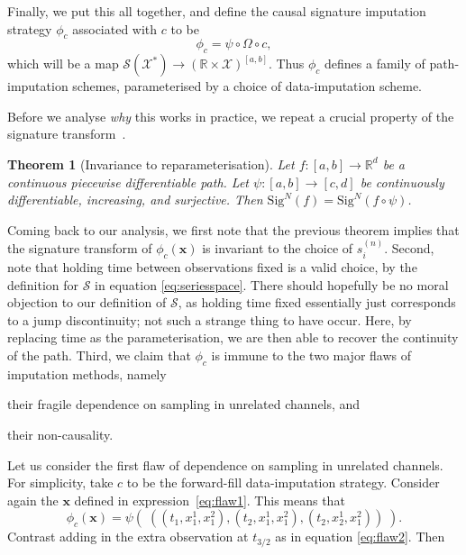\documentclass{article}
\newcommand{\reals}{\mathbb{R}}
\newcommand{\sig}{\mathrm{Sig}^N}
\newcommand{\dataspace}{\mathcal{X}}
\newcommand{\seriesspace}{\mathcal{S}}
\newtheorem{theorem}{Theorem}
\begin{document}
Finally, we put this all together, and define the causal signature imputation strategy $\phi_c$ associated with $c$ to be
%
\begin{equation*}
\phi_c = \psi \circ \Omega \circ c,
\end{equation*}
which will be a map $\seriesspace(\dataspace^*) \to (\reals \times \dataspace)^{[a, b]}$.
%
Thus $\phi_c$ defines a family of path-imputation schemes, parameterised by a choice of data-imputation scheme.

Before we analyse \emph{why} this works in practice, we repeat a crucial
property of the signature transform~\citep[Appendix~A]{kidger2019deep}.
%
\begin{theorem}[Invariance to reparameterisation]\label{theorem:invariancetime}
  Let $f \colon [a, b] \to \reals^d$ be a continuous piecewise
  differentiable path. Let $\psi \colon [a, b] \to [c, d]$ be continuously
  differentiable, increasing, and surjective. Then $\sig(f) = \sig(f \circ
  \psi)$.
\end{theorem}
%
Coming back to our analysis, we first note that the previous theorem
implies that the signature transform of $\phi_c(\mathbf{x})$ is
invariant to the choice of $s_i^{(n)}$.
%
Second, note that holding time between observations fixed is a valid
choice, by the definition for $\seriesspace$ in equation
\eqref{eq:seriesspace}. There should hopefully be no moral objection to
our definition of $\seriesspace$, as holding time fixed essentially just
corresponds to a jump discontinuity; not such a strange thing to have
occur. Here, by replacing time as the parameterisation, we are then able
to recover the continuity of the path.
%
Third, we claim that  $\phi_c$ is immune to the two major flaws of
imputation methods, namely
%
\begin{inparaenum}[(i)]
  \item their fragile dependence on sampling in unrelated channels, and
  \item their non-causality.
\end{inparaenum}
%
Let us consider the first flaw of dependence on sampling in unrelated channels.
%
For simplicity, take $c$ to be the forward-fill data-imputation
strategy. Consider again the $\mathbf{x}$ defined in expression~\eqref{eq:flaw1}.
This means that
%
\begin{equation}\label{eq:causal1}
    \phi_c(\mathbf{x}) = \psi(\;((t_1, x_1^1, x_1^2), (t_2, x_1^1, x_1^2), (t_2, x_2^1, x_1^2))\;).
\end{equation}
%
Contrast adding in the extra observation at $t_{3/2}$ as in equation \eqref{eq:flaw2}. Then
\end{document}
